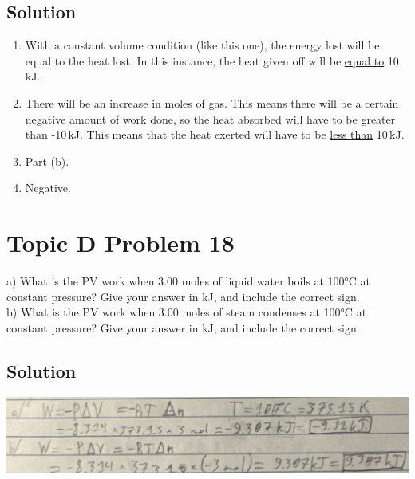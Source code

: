 \documentclass[10pt]{article}
\begin{document}
        \subsection{Solution}
        \begin{enumerate}[label=\alph*/]
            \item   With a constant volume condition (like this one), the energy lost will be equal to the heat lost.
                In this instance, the heat given off will be \underline{equal to} 10\,\unit{\kilo\joule}.
            \item   There will be an increase in moles of gas. This means there will be a certain negative amount of work done, so the heat absorbed will have to be greater than -10\,\unit{\kilo\joule}. This means that the heat exerted will have to be \underline{less than} 10\,\unit{\kilo\joule}.
            \item   Part (b).
            \item   Negative.
        \end{enumerate}

    \pagebreak
    \section{Topic D Problem 18}
        a) What is the PV work when 3.00 moles of liquid water boils at 100\unit{\celsius} at constant pressure? 
        Give your answer in kJ, and include the correct sign.\\
        b) What is the PV work when 3.00 moles of steam condenses at 100\unit{\celsius} at constant pressure?
        Give your answer in kJ, and include the correct sign.

        
        \subsection{Solution}
            \begin{center}
                \includegraphics[width=\textwidth]{Answers Images/Problem 18.jpg}
            \end{center}

    \pagebreak
\end{document}
